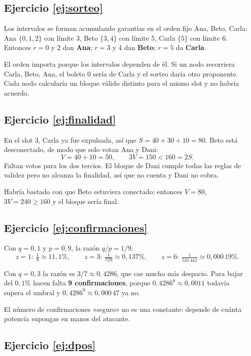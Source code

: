 \documentclass[11pt,a4paper]{article}
\theoremstyle{definition}
\theoremstyle{plain}
\theoremstyle{remark}
\begin{document}
\subsection*{Ejercicio \ref{ej:sorteo}}

Los intervalos se forman acumulando garantías en el orden fijo Ana, Beto, Carla:
Ana $\{0,1,2\}$ con límite 3, Beto $\{3,4\}$ con límite 5, Carla $\{5\}$ con
límite 6. Entonces $r = 0$ y $2$ dan \textbf{Ana}; $r = 3$ y $4$ dan
\textbf{Beto}; $r = 5$ da \textbf{Carla}.

El orden importa porque los intervalos dependen de él. Si un nodo recorriera
Carla, Beto, Ana, el boleto 0 sería de Carla y el sorteo daría otro proponente.
Cada nodo calcularía un bloque válido distinto para el mismo slot y no habría
acuerdo.

\subsection*{Ejercicio \ref{ej:finalidad}}

En el slot 3, Carla ya fue expulsada, así que $S = 40+30+10 = 80$. Beto está
desconectado, de modo que solo votan Ana y Dani:
\[
  V = 40 + 10 = 50, \qquad 3V = 150 < 160 = 2S.
\]
Faltan votos para los dos tercios. El bloque de Dani cumple todas las reglas de
validez pero no alcanza la finalidad, así que no cuenta y Dani no cobra.

Habría bastado con que Beto estuviera conectado: entonces $V = 80$,
$3V = 240 \ge 160$ y el bloque sería final.

\subsection*{Ejercicio \ref{ej:confirmaciones}}

Con $q = 0{,}1$ y $p = 0{,}9$, la razón $q/p = 1/9$:
\[
  z=1:\ \tfrac19 \approx 11{,}1\%, \qquad
  z=3:\ \tfrac1{729} \approx 0{,}137\%, \qquad
  z=6:\ \tfrac1{531\,441} \approx 0{,}000\,19\%.
\]

Con $q = 0{,}3$ la razón es $3/7 \approx 0{,}4286$, que cae mucho más despacio.
Para bajar del $0{,}1\%$ hacen falta \textbf{9 confirmaciones}, porque
$0{,}4286^{8} \approx 0{,}0011$ todavía supera el umbral y
$0{,}4286^{9} \approx 0{,}000\,47$ ya no.

El número de confirmaciones «seguro» no es una constante: depende de cuánta
potencia supongas en manos del atacante.

\subsection*{Ejercicio \ref{ej:dpos}}
\end{document}
